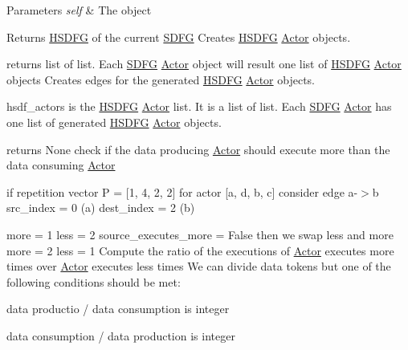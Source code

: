 \begin{DoxyParams}{Parameters}
{\em self} & The object\\
\hline
\end{DoxyParams}
\begin{DoxyReturn}{Returns}
\hyperlink{classsylva_1_1base_1_1sdf_1_1_h_s_d_f_g}{H\+S\+D\+FG} of the current \hyperlink{classsylva_1_1base_1_1sdf_1_1_s_d_f_g}{S\+D\+FG} Creates \hyperlink{classsylva_1_1base_1_1sdf_1_1_h_s_d_f_g}{H\+S\+D\+FG} \hyperlink{classsylva_1_1base_1_1sdf_1_1_actor}{Actor} objects.
\end{DoxyReturn}
returns list of list. Each \hyperlink{classsylva_1_1base_1_1sdf_1_1_s_d_f_g}{S\+D\+FG} \hyperlink{classsylva_1_1base_1_1sdf_1_1_actor}{Actor} object will result one list of \hyperlink{classsylva_1_1base_1_1sdf_1_1_h_s_d_f_g}{H\+S\+D\+FG} \hyperlink{classsylva_1_1base_1_1sdf_1_1_actor}{Actor} objects Creates edges for the generated \hyperlink{classsylva_1_1base_1_1sdf_1_1_h_s_d_f_g}{H\+S\+D\+FG} \hyperlink{classsylva_1_1base_1_1sdf_1_1_actor}{Actor} objects.

hsdf\+\_\+actors is the \hyperlink{classsylva_1_1base_1_1sdf_1_1_h_s_d_f_g}{H\+S\+D\+FG} \hyperlink{classsylva_1_1base_1_1sdf_1_1_actor}{Actor} list. It is a list of list. Each \hyperlink{classsylva_1_1base_1_1sdf_1_1_s_d_f_g}{S\+D\+FG} \hyperlink{classsylva_1_1base_1_1sdf_1_1_actor}{Actor} has one list of generated \hyperlink{classsylva_1_1base_1_1sdf_1_1_h_s_d_f_g}{H\+S\+D\+FG} \hyperlink{classsylva_1_1base_1_1sdf_1_1_actor}{Actor} objects.

returns None check if the data producing \hyperlink{classsylva_1_1base_1_1sdf_1_1_actor}{Actor} should execute more than the data consuming \hyperlink{classsylva_1_1base_1_1sdf_1_1_actor}{Actor}

if repetition vector P = \mbox{[}1, 4, 2, 2\mbox{]} for actor \mbox{[}a, d, b, c\mbox{]} consider edge a-\/$>$b src\+\_\+index = 0 (a) dest\+\_\+index = 2 (b)

more = 1 less = 2 source\+\_\+executes\+\_\+more = False then we swap less and more more = 2 less = 1 Compute the ratio of the executions of \hyperlink{classsylva_1_1base_1_1sdf_1_1_actor}{Actor} executes more times over \hyperlink{classsylva_1_1base_1_1sdf_1_1_actor}{Actor} executes less times We can divide data tokens but one of the following conditions should be met\+:


\begin{DoxyEnumerate}
\item data productio / data consumption is integer
\item data consumption / data production is integer
\end{DoxyEnumerate}

